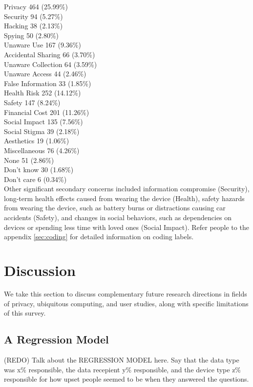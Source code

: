 \documentclass{acm_proc_article-sp}
\begin{document}
Privacy 				464 (25.99\%) \\
Security 				94 (5.27\%)\\
Hacking 				38 (2.13\%)\\
Spying 				50 (2.80\%)\\ [-.5cm]

Unaware Use 			167 (9.36\%)\\
Accidental Sharing 		66 (3.70\%)\\
Unaware Collection		64 (3.59\%)\\
Unaware Access	 	44 (2.46\%)\\
False Information 		33 (1.85\%)\\[-.5cm]

Health Risk 			252 (14.12\%)\\
Safety 				147 (8.24\%)\\
Financial Cost	 		201 (11.26\%)\\[-.5cm]

Social Impact 			135 (7.56\%)\\
Social Stigma 			39 (2.18\%)\\
Aesthetics 			19 (1.06\%)\\[-.5cm]

Miscellaneous 		76 (4.26\%)\\
None				51 (2.86\%)\\
Don't know		 30 (1.68\%)\\
Don't care 			6 (0.34\%)\\ [-.5cm]

Other significant secondary concerns included information compromise (Security), long-term health effects caused from wearing the device (Health), safety hazards from wearing the device, such as battery burns or distractions causing car accidents (Safety), and changes in social behaviors, such as dependencies on devices or spending less time with loved ones (Social Impact). Refer people to the appendix \ref{sec:coding} for detailed information on coding labels. 


\section{Discussion}
We take this section to discuss complementary future research directions in fields of privacy, ubiquitous computing, and user studies, along with specific limitations of this survey. 

\subsection{A Regression Model}
(REDO) Talk about the REGRESSION MODEL here. Say that the data type was x\% responsible, the data recepient y\% responsible, and the device type z\% responsible for how upset people seemed to be when they answered the questions. 
\end{document}
